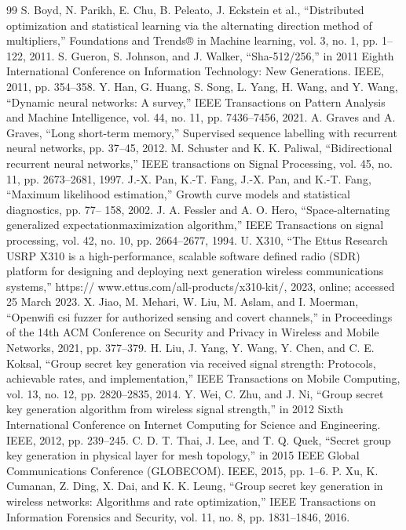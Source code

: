 \documentclass[journal]{IEEEtran}
\begin{document}
\begin{thebibliography}{99}
 S. Boyd, N. Parikh, E. Chu, B. Peleato, J. Eckstein et al., “Distributed optimization and statistical learning via the alternating direction method of multipliers,” Foundations and Trends® in Machine learning, vol. 3, no. 1, pp. 1–122, 2011.
 S. Gueron, S. Johnson, and J. Walker, “Sha-512/256,” in 2011 Eighth International Conference on Information Technology: New Generations. IEEE, 2011, pp. 354–358.
 Y. Han, G. Huang, S. Song, L. Yang, H. Wang, and Y. Wang, “Dynamic neural networks: A survey,” IEEE Transactions on Pattern Analysis and Machine Intelligence, vol. 44, no. 11, pp. 7436–7456, 2021.
 A. Graves and A. Graves, “Long short-term memory,” Supervised sequence labelling with recurrent neural networks, pp. 37–45, 2012.
 M. Schuster and K. K. Paliwal, “Bidirectional recurrent neural networks,” IEEE transactions on Signal Processing, vol. 45, no. 11, pp. 2673–2681, 1997.
 J.-X. Pan, K.-T. Fang, J.-X. Pan, and K.-T. Fang, “Maximum likelihood estimation,” Growth curve models and statistical diagnostics, pp. 77– 158, 2002.
 J. A. Fessler and A. O. Hero, “Space-alternating generalized expectationmaximization algorithm,” IEEE Transactions on signal processing, vol. 42, no. 10, pp. 2664–2677, 1994.
 U. X310, “The Ettus Research USRP X310 is a high-performance, scalable software defined radio (SDR) platform for designing and deploying next generation wireless communications systems,” https:// www.ettus.com/all-products/x310-kit/, 2023, online; accessed 25 March 2023.
 X. Jiao, M. Mehari, W. Liu, M. Aslam, and I. Moerman, “Openwifi csi fuzzer for authorized sensing and covert channels,” in Proceedings of the 14th ACM Conference on Security and Privacy in Wireless and Mobile Networks, 2021, pp. 377–379.
 H. Liu, J. Yang, Y. Wang, Y. Chen, and C. E. Koksal, “Group secret key generation via received signal strength: Protocols, achievable rates, and implementation,” IEEE Transactions on Mobile Computing, vol. 13, no. 12, pp. 2820–2835, 2014.
 Y. Wei, C. Zhu, and J. Ni, “Group secret key generation algorithm from wireless signal strength,” in 2012 Sixth International Conference on Internet Computing for Science and Engineering. IEEE, 2012, pp. 239–245.
 C. D. T. Thai, J. Lee, and T. Q. Quek, “Secret group key generation in physical layer for mesh topology,” in 2015 IEEE Global Communications Conference (GLOBECOM). IEEE, 2015, pp. 1–6.
 P. Xu, K. Cumanan, Z. Ding, X. Dai, and K. K. Leung, “Group secret key generation in wireless networks: Algorithms and rate optimization,” IEEE Transactions on Information Forensics and Security, vol. 11, no. 8, pp. 1831–1846, 2016.
\end{thebibliography}
\end{document}
